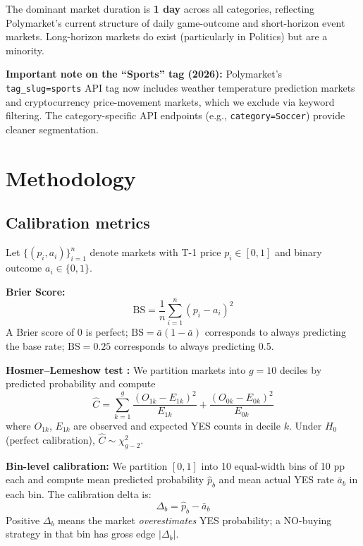 \documentclass[11pt,a4paper]{article}
\begin{document}
The dominant market duration is \textbf{1 day} across all categories, reflecting
Polymarket's current structure of daily game-outcome and short-horizon event markets.
Long-horizon markets do exist (particularly in Politics) but are a minority.

\textbf{Important note on the ``Sports'' tag (2026):}
Polymarket's \texttt{tag\_slug=sports} API tag now includes weather temperature
prediction markets and cryptocurrency price-movement markets, which we exclude
via keyword filtering.
The category-specific API endpoints (e.g., \texttt{category=Soccer}) provide
cleaner segmentation.

\section{Methodology}

\subsection{Calibration metrics}

Let $\{(p_i, a_i)\}_{i=1}^n$ denote markets with T-1 price $p_i \in [0,1]$
and binary outcome $a_i \in \{0,1\}$.

\textbf{Brier Score:}
\begin{equation}
  \mathrm{BS} = \frac{1}{n}\sum_{i=1}^n (p_i - a_i)^2
\end{equation}
A Brier score of 0 is perfect; $\mathrm{BS} = \bar{a}(1-\bar{a})$ corresponds
to always predicting the base rate; $\mathrm{BS} = 0.25$ corresponds to always
predicting 0.5.

\textbf{Hosmer--Lemeshow test \citep{hosmer1980goodness}:}
We partition markets into $g=10$ deciles by predicted probability and compute
\begin{equation}
  \hat{C} = \sum_{k=1}^{g}
    \frac{(O_{1k} - E_{1k})^2}{E_{1k}} +
    \frac{(O_{0k} - E_{0k})^2}{E_{0k}}
\end{equation}
where $O_{1k}$, $E_{1k}$ are observed and expected YES counts in decile $k$.
Under $H_0$ (perfect calibration), $\hat{C} \sim \chi^2_{g-2}$.

\textbf{Bin-level calibration:} We partition $[0,1]$ into 10 equal-width bins
of 10 pp each and compute mean predicted probability $\hat{p}_b$ and mean
actual YES rate $\bar{a}_b$ in each bin. The calibration delta is:
\begin{equation}
  \Delta_b = \hat{p}_b - \bar{a}_b
\end{equation}
Positive $\Delta_b$ means the market \emph{overestimates} YES probability;
a NO-buying strategy in that bin has gross edge $|\Delta_b|$.
\end{document}
